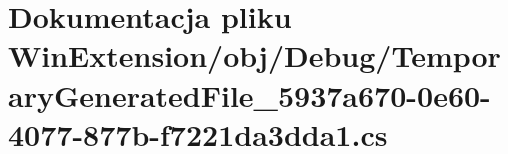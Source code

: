 \hypertarget{_win_extension_2obj_2_debug_2_temporary_generated_file__5937a670-0e60-4077-877b-f7221da3dda1_8cs}{}\section{Dokumentacja pliku Win\+Extension/obj/\+Debug/\+Temporary\+Generated\+File\+\_\+5937a670-\/0e60-\/4077-\/877b-\/f7221da3dda1.cs}
\label{_win_extension_2obj_2_debug_2_temporary_generated_file__5937a670-0e60-4077-877b-f7221da3dda1_8cs}
